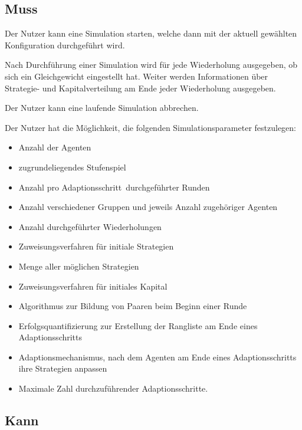 \documentclass[parskip=full,11pt]{scrartcl}
\def\adapt{Adaptionsschritt}
\def\adapts{Adaptionsschritte}
\begin{document}
\subsection{Muss}


Der Nutzer kann eine Simulation starten, welche dann mit der aktuell gewählten Konfiguration durchgeführt wird.


Nach Durchführung einer Simulation wird für jede Wiederholung ausgegeben, ob sich ein Gleichgewicht eingestellt hat. Weiter werden Informationen über Strategie- und Kapitalverteilung am Ende jeder Wiederholung ausgegeben.


Der Nutzer kann eine laufende Simulation abbrechen.


Der Nutzer hat die Möglichkeit, die folgenden Simulationsparameter festzulegen:
\begin{itemize} \itemsep -10pt
\item Anzahl der Agenten
\item zugrundeliegendes Stufenspiel
\item Anzahl pro \adapt\ durchgeführter Runden
\item Anzahl verschiedener Gruppen und jeweils Anzahl zugehöriger Agenten
\item Anzahl durchgeführter Wiederholungen
\item Zuweisungsverfahren für initiale Strategien
\item Menge aller möglichen Strategien
\item Zuweisungsverfahren für initiales Kapital
\item Algorithmus zur Bildung von Paaren beim Beginn einer Runde
\item Erfolgsquantifizierung zur Erstellung der Rangliste am Ende eines \adapt s
\item Adaptionsmechanismus, nach dem Agenten am Ende eines \adapt s ihre Strategien anpassen
\item Maximale Zahl durchzuführender \adapts.
\end{itemize}

\subsection{Kann}
\end{document}
